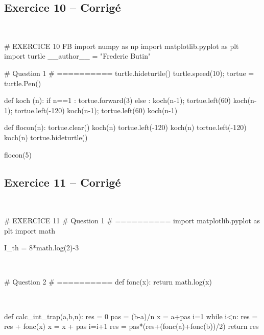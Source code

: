 \documentclass[10pt,fleqn]{article} %
\begin{document}

\subsection*{Exercice 10 -- Corrigé}


\begin{corrige}
$\quad$
\begin{python}
# EXERCICE 10 FB
import numpy as np
import matplotlib.pyplot as plt
import turtle
__author__ = "Frederic Butin"

# Question 1 
# ==========
turtle.hideturtle()
turtle.speed(10);
tortue = turtle.Pen()

def koch (n):
    if n==1 : 
        tortue.forward(3)
    else : 
        koch(n-1);
        tortue.left(60)
        koch(n-1);
        tortue.left(-120)
        koch(n-1);
        tortue.left(60)
        koch(n-1)
        

def flocon(n):
    tortue.clear()
    koch(n)
    tortue.left(-120)
    koch(n)
    tortue.left(-120)
    koch(n)
    tortue.hideturtle()

flocon(5)
\end{python}
\end{corrige}



\subsection*{Exercice 11 -- Corrigé}

\begin{corrige}
$\quad$
\begin{python}
# EXERCICE 11
# Question 1 
# ==========
import matplotlib.pyplot as plt
import math

I_th = 8*math.log(2)-3
\end{python}
\end{corrige}

\begin{corrige}
$\quad$
\begin{python}
# Question 2
# ==========
def fonc(x):
    return math.log(x)
\end{python}
\end{corrige}


\begin{corrige}
$\quad$
\begin{python}    
def calc_int_trap(a,b,n):
    res = 0
    pas = (b-a)/n
    x = a+pas
    i=1
    while i<n:
        res = res + fonc(x)
        x = x + pas
        i=i+1
    res = pas*(res+(fonc(a)+fonc(b))/2)
    return res
\end{python}
\end{corrige}
\end{document}
